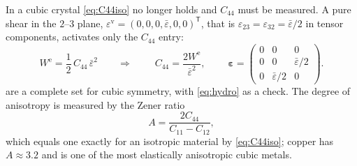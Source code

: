 \documentclass[11pt,a4paper]{article}
\numberwithin{equation}{section}
\theoremstyle{remark}
\newcommand{\beps}{\bm{\varepsilon}}
\newcommand{\We}{W^{\mathrm{e}}}
\newcommand{\epsb}{\bar{\varepsilon}}
\begin{document}
In a cubic crystal \cref{eq:C44iso} no longer holds and $C_{44}$ must be measured. A pure shear in the
$2$--$3$ plane, $\varepsilon^{\mathrm{v}} = (0,0,0,\epsb,0,0)^{\mathsf T}$, that is
$\varepsilon_{23} = \varepsilon_{32} = \epsb/2$ in tensor components, activates only the $C_{44}$
entry:
\begin{equation}\label{eq:C44}
  \We = \frac{1}{2}\,C_{44}\,\epsb^2
  \qquad\Longrightarrow\qquad
  \boxed{\;C_{44} = \frac{2\We}{\epsb^2},\;}
  \qquad
  \beps = \begin{pmatrix} 0 & 0 & 0 \\ 0 & 0 & \epsb/2 \\ 0 & \epsb/2 & 0\end{pmatrix}.
\end{equation}
 are a complete set for cubic symmetry, with \cref{eq:hydro} as a check.
The degree of anisotropy is measured by the Zener ratio
\begin{equation}\label{eq:zener}
  A = \frac{2C_{44}}{C_{11}-C_{12}},
\end{equation}
which equals one exactly for an isotropic material by \cref{eq:C44iso}; copper has $A \approx 3.2$ and
is one of the most elastically anisotropic cubic metals.
\end{document}
